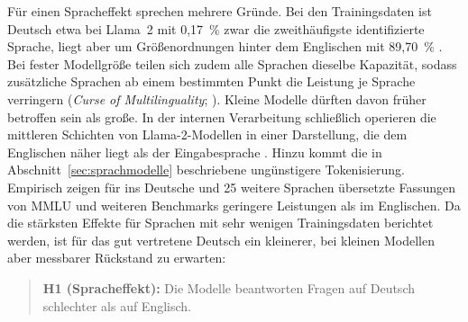\documentclass[a4paper,titlepage]{article}
\numberwithin{equation}{section} %
\begin{document}
Für einen Spracheffekt sprechen mehrere Gründe. Bei den Trainingsdaten ist Deutsch etwa bei Llama~2 mit 0,17~\% zwar die zweithäufigste identifizierte Sprache, liegt aber um Größenordnungen hinter dem Englischen mit 89,70~\% \citep{touvron_llama_2023}. Bei fester Modellgröße teilen sich zudem alle Sprachen dieselbe Kapazität, sodass zusätzliche Sprachen ab einem bestimmten Punkt die Leistung je Sprache verringern (\emph{Curse of Multilinguality}; \citealp{conneau_unsupervised_2020}). Kleine Modelle dürften davon früher betroffen sein als große. In der internen Verarbeitung schließlich operieren die mittleren Schichten von Llama-2-Modellen in einer Darstellung, die dem Englischen näher liegt als der Eingabesprache \citep{wendler_llamas_2024}. Hinzu kommt die in Abschnitt~\ref{sec:sprachmodelle} beschriebene ungünstigere Tokenisierung. Empirisch zeigen \citet{lai_okapi_2023} für ins Deutsche und 25 weitere Sprachen übersetzte Fassungen von MMLU und weiteren Benchmarks geringere Leistungen als im Englischen. Da die stärksten Effekte für Sprachen mit sehr wenigen Trainingsdaten berichtet werden, ist für das gut vertretene Deutsch ein kleinerer, bei kleinen Modellen aber messbarer Rückstand zu erwarten:

\begin{quote}
\textbf{H1 (Spracheffekt):} Die Modelle beantworten Fragen auf Deutsch schlechter als auf Englisch.
\end{quote}
\end{document}
